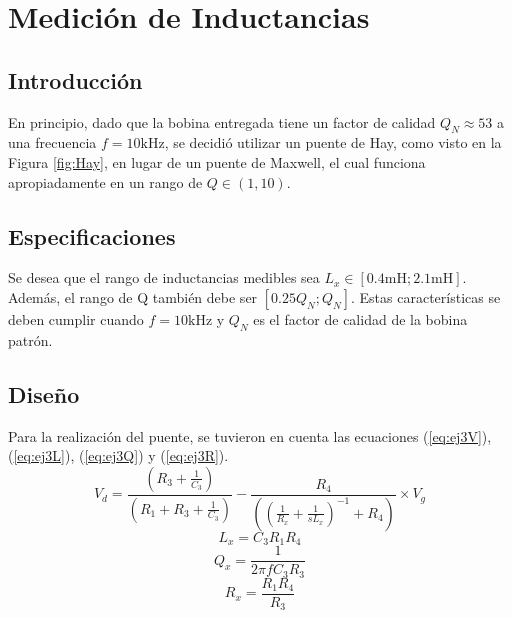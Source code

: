 \chapter{Medición de Inductancias}
    \section{Introducción}
    \label{sec:ej3Intro}
    \begin{figure}[h]
        \begin{center}
            
        \end{center}
        
    \end{figure}
    En principio, dado que la bobina entregada tiene un factor de calidad
    $Q_N\approx53$ a una frecuencia $f=10\si{\kilo\hertz}$, se decidió utilizar un
    puente de Hay, como visto en la Figura \ref{fig:Hay}, en lugar de un puente de
    Maxwell, el cual funciona apropiadamente en un rango de $Q\in(1,10)$.
    
    \section{Especificaciones}
    \label{sec:ej3Specs}
    Se desea que el rango de inductancias medibles sea $L_x\in[0.4\si{\milli\henry};
    2.1\si{\milli\henry}]$. Además, el rango de Q también debe ser $[0.25Q_N; Q_N]$.
    Estas características se deben cumplir cuando $f=10\si{\kilo\hertz}$ y $Q_N$ es
    el factor de calidad de la bobina patrón.
    
    \section{Diseño}
    \label{sec:ej3Design}
    Para la realización del puente, se tuvieron en cuenta las ecuaciones (\ref{eq:ej3V}),
    (\ref{eq:ej3L}), (\ref{eq:ej3Q}) y (\ref{eq:ej3R}).
    \begin{equation}
        V_d=\frac{(R_3 + \frac{1}{C_3})}{(R_1+R_3 + \frac{1}{C_3})} - \frac{R_4}{((\frac{1}{R_x}+\frac{1}{sL_x})^{-1}+R_4)} \times V_g
        \label{eq:ej3V}
    \end{equation}
    \begin{equation}
        L_x = C_3 R_1 R_4
        \label{eq:ej3L}
    \end{equation}
    \begin{equation}
        Q_x=\frac{1}{2 \pi f C_3 R_3}
        \label{eq:ej3Q}
    \end{equation}
    \begin{equation}
        R_x=\frac{R_1 R_4}{R_3}
        \label{eq:ej3R}
    \end{equation}

